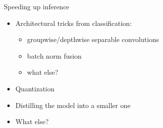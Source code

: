 \documentclass[10pt, handout]{beamer}
\begin{document}
\begin{frame}{Speeding up inference}
    \begin{itemize}
        \item\pause Architectural tricks from classification:
        \begin{itemize}
            \item\pause groupwise/depthwise separable convolutions
            \item\pause batch norm fusion
            \item\pause what else?
        \end{itemize}
        \item\pause Quantization
        \item\pause Distilling the model into a smaller one
        \item\pause What else?
    \end{itemize}
\end{frame}
\end{document}
